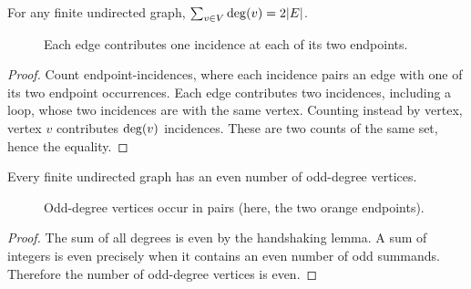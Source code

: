 \begin{theorem}
For any finite undirected graph, $\sum_{v\in V}\operatorname{deg}(v)=2|E|$.
\end{theorem}
\begin{figure}[htbp]
\centering
{}
\caption{Each edge contributes one incidence at each of its two endpoints.}
\end{figure}
\begin{proof}
Count endpoint-incidences, where each incidence pairs an edge with one of its two endpoint occurrences. Each edge contributes two incidences, including a loop, whose two incidences are with the same vertex. Counting instead by vertex, vertex $v$ contributes $\operatorname{deg}(v)$ incidences. These are two counts of the same set, hence the equality.
\end{proof}

\begin{corollary}
Every finite undirected graph has an even number of odd-degree vertices.
\end{corollary}
\begin{figure}[htbp]
\centering
{}
\caption{Odd-degree vertices occur in pairs (here, the two orange endpoints).}
\end{figure}
\begin{proof}
The sum of all degrees is even by the handshaking lemma. A sum of integers is even precisely when it contains an even number of odd summands. Therefore the number of odd-degree vertices is even.
\end{proof}

